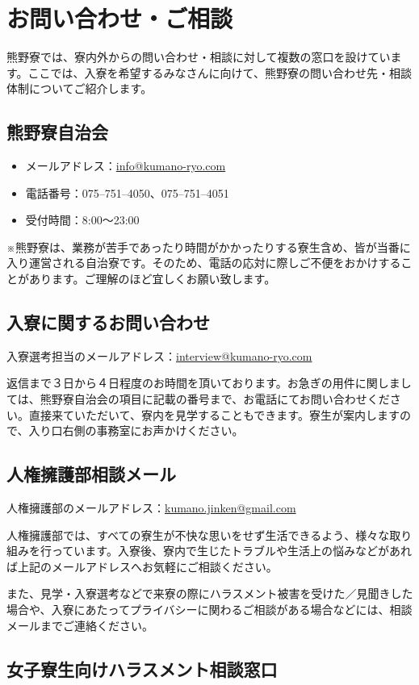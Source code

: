 \section{お問い合わせ・ご相談}\label{sec:otoiawase}
熊野寮では、寮内外からの問い合わせ・相談に対して複数の窓口を設けています。ここでは、入寮を希望するみなさんに向けて、熊野寮の問い合わせ先・相談体制についてご紹介します。

\subsection{熊野寮自治会}
\begin{itemize}
\item メールアドレス：\url{info@kumano-ryo.com}
\item 電話番号：075--751--4050、075--751--4051
\item 受付時間：8:00～23:00
\end{itemize}
\noindent ※熊野寮は、業務が苦手であったり時間がかかったりする寮生含め、皆が当番に入り運営される自治寮です。そのため、電話の応対に際しご不便をおかけすることがあります。ご理解のほど宜しくお願い致します。

\subsection{入寮に関するお問い合わせ}
\noindent 入寮選考担当のメールアドレス：\url{interview@kumano-ryo.com}

返信まで３日から４日程度のお時間を頂いております。お急ぎの用件に関しましては、熊野寮自治会の項目に記載の番号まで、お電話にてお問い合わせください。直接来ていただいて、寮内を見学することもできます。寮生が案内しますので、入り口右側の事務室にお声かけください。

\subsection{人権擁護部相談メール}
\noindent 人権擁護部のメールアドレス：\url{kumano.jinken@gmail.com}

人権擁護部では、すべての寮生が不快な思いをせず生活できるよう、様々な取り組みを行っています。入寮後、寮内で生じたトラブルや生活上の悩みなどがあれば上記のメールアドレスへお気軽にご相談ください。

また、見学・入寮選考などで来寮の際にハラスメント被害を受けた／見聞きした場合や、入寮にあたってプライバシーに関わるご相談がある場合などには、相談メールまでご連絡ください。

\subsection{女子寮生向けハラスメント相談窓口}


